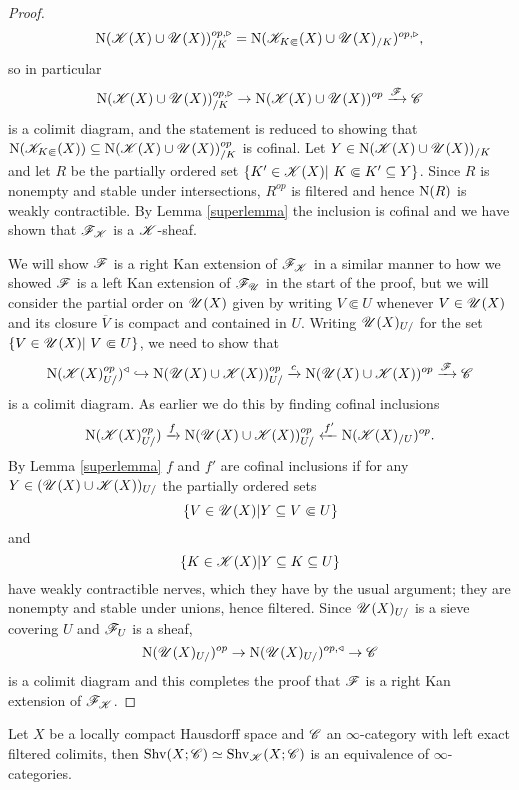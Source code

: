 \documentclass[../../thesis.tex]{subfiles}
\begin{document}
\begin{proof}
\[        \mathrm{N}(\mathscr{K}(X) \cup \mathscr{U}(X))^{op,\triangleright}_{/K} = \mathrm{N}(\mathscr{K}_{K\Subset}(X) \cup \mathscr{U}(X)_{/K})^{op,\triangleright},
    \]
    so in particular
    \[
        \mathrm{N}(\mathscr{K}(X) \cup \mathscr{U}(X))^{op,\triangleright}_{/K} \to \mathrm{N}(\mathscr{K}(X) \cup \mathscr{U}(X))^{op} \xrightarrow{\mathscr{F}} \mathscr{C}
    \]
    is a colimit diagram, and the statement is reduced to showing that $\mathrm{N}(\mathscr{K}_{K\Subset}(X)) \subseteq \mathrm{N}(\mathscr{K}(X) \cup \mathscr{U}(X))_{/K}^{op}$ is cofinal.
    Let $Y\in \mathrm{N}(\mathscr{K}(X) \cup \mathscr{U}(X))_{/K}$ and let $R$ be the partially ordered set $\{K' \in \K(X) | K \Subset K ' \subseteq Y\}$.
    Since $R$ is nonempty and stable under intersections, $R^{op}$ is filtered and hence $\mathrm{N}(R)$ is weakly contractible.
    By Lemma \ref{superlemma} the inclusion is cofinal and we have shown that $\mathscr{F}_{\mathscr{K}}$ is a $\mathscr{K}$-sheaf.

    We will show $\mathscr{F}$ is a right Kan extension of $\mathscr{F}_{\mathscr{K}}$ in a similar manner to how we showed $\mathscr{F}$ is a left Kan extension of $\mathscr{F}_{\mathscr{U}}$ in the start of the proof, but we will consider the partial order on $\mathscr{U}(X)$ given by writing $V\Subset U$ whenever $V\in \mathscr{U}(X)$ and its closure $\overline{V}$ is compact and contained in $U$.
    Writing $\mathscr{U}(X)_{U/}$ for the set $\{V\in \Open(X) | V\Subset U\}$, we need to show that
    \[
        \mathrm{N}(\mathscr{K}(X)_{U/}^{op})^{\triangleleft} \hookrightarrow \mathrm{N}(\mathscr{U}(X) \cup \mathscr{K}(X))_{U/}^{op} \xrightarrow{c}\mathrm{N}(\mathscr{U}(X) \cup \mathscr{K}(X))^{op} \xrightarrow{\mathscr{F}} \mathscr{C}
    \]
    is a colimit diagram.
    As earlier we do this by finding cofinal inclusions
    \[
        \mathrm{N}(\mathscr{K}(X)_{U/}^{op}) \xrightarrow{f}\mathrm{N}(\mathscr{U}(X) \cup \mathscr{K}(X))_{U/}^{op} \xleftarrow{f'} \mathrm{N}(\mathscr{K}(X)_{/U})^{op}.
    \]
    By Lemma \ref{superlemma} $f$ and $f'$ are cofinal inclusions if for any $Y\in (\mathscr{U}(X) \cup \mathscr{K}(X))_{U/}$ the partially ordered sets
    \[
        \{ V \in \mathscr{U}(X) |Y \subseteq V \Subset U \}
    \]
    and
    \[
        \{ K \in \mathscr{K}(X) |Y \subseteq K \subseteq U \}
    \]
    have weakly contractible nerves, which they have by the usual argument; they are nonempty and stable under unions, hence filtered.
    Since $\mathscr{U}(X)_{U/}$ is a sieve covering $U$ and $\mathscr{F}_U$ is a sheaf,
    \[
        \mathrm{N}(\mathscr{U}(X)_{U/})^{op} \to \mathrm{N}(\mathscr{U}(X)_{U/})^{op, \triangleleft} \to \mathscr{C}
    \]
    is a colimit diagram and this completes the proof that $\mathscr{F}$ is a right Kan extension of $\mathscr{F}_{\mathscr{K}}$.
\end{proof}
\begin{corollary}\label{7.3.4.10}
    Let $X$ be a locally compact Hausdorff space and $\mathscr{C}$ an $\infty$-category with left exact filtered colimits, then $\mathrm{Shv}(X;\mathscr{C}) \simeq \mathrm{Shv}_{\mathscr{K}}(X;\mathscr{C})$ is an equivalence of $\infty$-categories.
\end{corollary}
\end{document}
